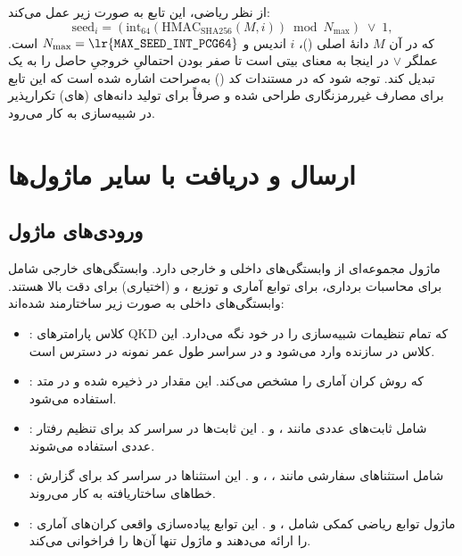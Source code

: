 از نظر ریاضی، این تابع به صورت زیر عمل می‌کند:
\begin{equation}
	\text{seed}_i = \left(\text{int}_{64}\!\left(\text{HMAC}_{\text{SHA256}}(M, i)\right) \bmod N_{\max}\right) \;\vee\; 1,
\end{equation}
که در آن $M$ دانهٔ اصلی ()، $i$ اندیس و $N_{\max} = \text{\lr{\texttt{MAX\_SEED\_INT\_PCG64}}}$ است. عملگر $\lor$ در اینجا به معنای  بیتی است تا صفر بودن احتمالیِ خروجیِ حاصل را به یک تبدیل کند. توجه شود که در مستندات کد () به‌صراحت اشاره شده است که این تابع برای مصارف غیررمزنگاری طراحی شده و صرفاً برای تولید دانه‌های (های) تکرارپذیر در شبیه‌سازی به کار می‌رود.



\section{ارسال و دریافت با سایر ماژول‌ها}

\subsection{ورودی‌های ماژول}

ماژول  مجموعه‌ای از وابستگی‌های داخلی و خارجی دارد. وابستگی‌های خارجی شامل  برای محاسبات برداری،  برای توابع آماری و توزیع ، و  (اختیاری) برای دقت بالا هستند. وابستگی‌های داخلی به صورت زیر ساختارمند شده‌اند:

\begin{itemize}
	\item {}: کلاس پارامترهای QKD که تمام تنظیمات شبیه‌سازی را در خود نگه می‌دارد. این کلاس در سازنده  وارد می‌شود و در سراسر طول عمر نمونه در دسترس است.
	\item {}:  که روش کران آماری را مشخص می‌کند. این مقدار در  ذخیره شده و در متد  استفاده می‌شود.
	\item {}: شامل ثابت‌های عددی مانند ،  و . این ثابت‌ها در سراسر کد برای تنظیم رفتار عددی استفاده می‌شوند.
	\item {}: شامل استثناهای سفارشی مانند ، ،  و . این استثناها در سراسر کد برای گزارش خطاهای ساختاریافته به کار می‌روند.
	\item {}: ماژول توابع ریاضی کمکی شامل ،  و . این توابع پیاده‌سازی واقعی کران‌های آماری را ارائه می‌دهند و ماژول  تنها آن‌ها را فراخوانی می‌کند.
\end{itemize}

